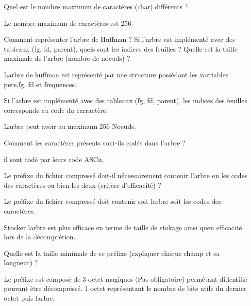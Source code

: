 \begin{DoxyItemize}
\item Quel est le nombre maximum de caractères (char) différents ?
\begin{DoxyItemize}
\item Le nombre maximum de caractères est 256.
\end{DoxyItemize}
\item Comment représenter l’arbre de Huffman ? Si l’arbre est implémenté avec des tableaux (fg, fd, parent), quels sont les indices des feuilles ? Quelle est la taille maximale de l’arbre (nombre de noeuds) ?
\begin{DoxyItemize}
\item L\textquotesingle{}arbre de huffman est représenté par une structure possédant les varriables {\ttfamily pere},{\ttfamily fg}, {\ttfamily fd} et {\ttfamily frequences}.
\item Si l’arbre est implémenté avec des tableaux (fg, fd, parent), les indices des feuilles corresponde au code du carractère.
\item L\textquotesingle{}arbre peut avoir au maximum 256 Noeuds.
\end{DoxyItemize}
\item Comment les caractères présents sont-\/ils codés dans l’arbre ?
\begin{DoxyItemize}
\item il sont codé par leurs code A\+S\+Cii.
\end{DoxyItemize}
\item Le préfixe du fichier compressé doit-\/il nécessairement contenir l’arbre ou les codes des caractères ou bien les deux (critère d’efficacité) ?
\begin{DoxyItemize}
\item Le préfixe du fichier compressé doit contenir soit l\textquotesingle{}arbre soit les codes des caractères.
\item Stocker l\textquotesingle{}arbre est plus efficace en terme de taille de stokage ainsi qu\textquotesingle{}en efficacité lors de la décomprétion.
\end{DoxyItemize}
\item Quelle est la taille minimale de ce préfixe (expliquer chaque champ et sa longueur) ?
\begin{DoxyItemize}
\item Le préfixe est composé de 3 octet magiques (Pas obligatoire) permétant d\textquotesingle{}identifié pouvant être décompréssé. 1 octet représentant le nombre de bits utile du dernier octet puis l\textquotesingle{}arbre.

\end{DoxyItemize}
\end{DoxyItemize}
